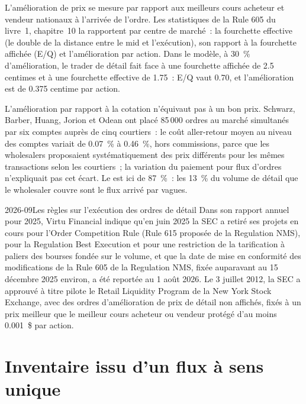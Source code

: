 L'amélioration de prix se mesure par rapport aux meilleurs cours acheteur et vendeur nationaux à l'arrivée de l'ordre. Les statistiques de la Rule 605 du livre~1, chapitre~10 la rapportent
par centre de marché~: la fourchette effective (le double de la distance entre le mid et l'exécution), son rapport à la fourchette affichée (E/Q) et l'amélioration par
action. Dans le modèle, à 30~\% d'amélioration, le trader de détail fait face à une fourchette affichée de 2.5 centimes et à une fourchette effective de 1.75~: E/Q vaut 0.70, et
l'amélioration est de 0.375 centime par action.

L'amélioration par rapport à la cotation n'équivaut pas à un bon prix. Schwarz, Barber, Huang, Jorion et Odean ont placé 85\,000 ordres au marché simultanés
par six comptes auprès de cinq courtiers~: le coût aller-retour moyen au niveau des comptes variait de 0.07~\% à 0.46~\%, hors commissions, parce que les
wholesalers proposaient systématiquement des prix différents pour les mêmes transactions selon les courtiers~; la variation du paiement pour flux d'ordres n'expliquait pas
cet écart. Le  est ici de 87~\%~: les 13~\% du volume de détail que le wholesaler couvre sont le flux arrivé par vagues.

\begin{dated}{2026-09}{Les règles sur l'exécution des ordres de détail}\label{dat:hf:retail-wholesaling:rules}
Dans son rapport annuel pour 2025, Virtu Financial indique qu'en juin 2025 la SEC a retiré ses projets en cours pour l'Order Competition Rule
(Rule 615 proposée de la Regulation NMS), pour la Regulation Best Execution et pour une restriction de la tarification à paliers des bourses fondée sur le volume, et que la
date de mise en conformité des modifications de la Rule 605 de la Regulation NMS, fixée auparavant au 15 décembre 2025 environ, a été reportée au 1 août 2026. Le 3 juillet
2012, la SEC a approuvé à titre pilote le Retail Liquidity Program de la New York Stock Exchange, avec des ordres d'amélioration de prix de détail non affichés,
fixés à un prix meilleur que le meilleur cours acheteur ou vendeur protégé d'au moins 0.001~\$ par action.
\end{dated}

\section{Inventaire issu d'un flux à sens unique}

